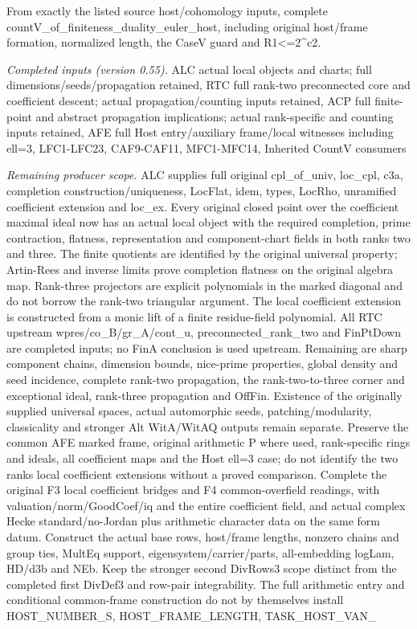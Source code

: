\documentclass[11pt,a4paper]{article}
\numberwithin{equation}{section}
\theoremstyle{remark}\newtheorem{remark}[theorem]{Remark}
\begin{document}
From exactly the listed source host/cohomology inputs, complete countV\_\allowbreak of\_\allowbreak finiteness\_\allowbreak duality\_\allowbreak euler\_\allowbreak host, including original host/frame formation, normalized length, the CaseV guard and R1<=2\textasciicircum{}c2.

\emph{Completed inputs (version 0.55).} ALC actual local objects and charts; full dimensions/seeds/propagation retained, RTC full rank-two preconnected core and coefficient descent; actual propagation/counting inputs retained, ACP full finite-point and abstract propagation implications; actual rank-specific and counting inputs retained, AFE full Host entry/auxiliary frame/local witnesses including ell=3, LFC1-LFC23, CAF9-CAF11, MFC1-MFC14, Inherited CountV consumers

\emph{Remaining producer scope.} ALC supplies full original cpl\_\allowbreak of\_\allowbreak univ, loc\_\allowbreak cpl, c3a, completion construction/uniqueness, LocFlat, idem, types, LocRho, unramified coefficient extension and loc\_\allowbreak ex. Every original closed point over the coefficient maximal ideal now has an actual local object with the required completion, prime contraction, flatness, representation and component-chart fields in both ranks two and three. The finite quotients are identified by the original universal property; Artin-Rees and inverse limits prove completion flatness on the original algebra map. Rank-three projectors are explicit polynomials in the marked diagonal and do not borrow the rank-two triangular argument. The local coefficient extension is constructed from a monic lift of a finite residue-field polynomial. All RTC upstream wpres/co\_\allowbreak B/gr\_\allowbreak A/cont\_\allowbreak u, preconnected\_\allowbreak rank\_\allowbreak two and FinPtDown are completed inputs; no FinA conclusion is used upstream. Remaining are sharp component chains, dimension bounds, nice-prime properties, global density and seed incidence, complete rank-two propagation, the rank-two-to-three corner and exceptional ideal, rank-three propagation and OffFin. Existence of the originally supplied universal spaces, actual automorphic seeds, patching/modularity, classicality and stronger Alt WitA/WitAQ outputs remain separate. Preserve the common AFE marked frame, original arithmetic P where used, rank-specific rings and ideals, all coefficient maps and the Host ell=3 case; do not identify the two ranks local coefficient extensions without a proved comparison. Complete the original F3 local coefficient bridges and F4 common-overfield readings, with valuation/norm/GoodCoef/iq and the entire coefficient field, and actual complex Hecke standard/no-Jordan plus arithmetic character data on the same form datum. Construct the actual base rows, host/frame lengths, nonzero chains and group ties, MultEq support, eigensystem/carrier/parts, all-embedding logLam, HD/d3b and NEb. Keep the stronger second DivRows3 scope distinct from the completed first DivDef3 and row-pair integrability. The full arithmetic entry and conditional common-frame construction do not by themselves install HOST\_\allowbreak NUMBER\_\allowbreak S, HOST\_\allowbreak FRAME\_\allowbreak LENGTH, TASK\_\allowbreak HOST\_\allowbreak VAN\_\allowbreak 
\end{document}
